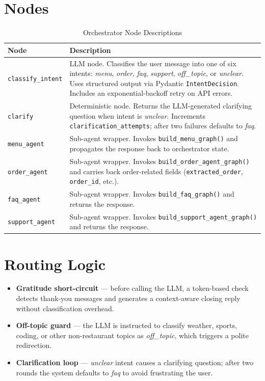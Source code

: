 \documentclass[12pt,a4paper]{report}
\begin{document}
\section{Nodes}

\begin{table}[H]
\centering
\caption{Orchestrator Node Descriptions}
\begin{tabularx}{\textwidth}{lX}
\toprule
\textbf{Node} & \textbf{Description} \\
\midrule
\texttt{classify\_intent}  &
    LLM node. Classifies the user message into one of six intents:
    \textit{menu}, \textit{order}, \textit{faq}, \textit{support}, \textit{off\_topic},
    or \textit{unclear}. Uses structured output via Pydantic \texttt{IntentDecision}.
    Includes an exponential-backoff retry on API errors. \\[0.4em]
\texttt{clarify}           &
    Deterministic node. Returns the LLM-generated clarifying question when intent is
    \textit{unclear}. Increments \texttt{clarification\_attempts}; after two failures
    defaults to \textit{faq}. \\[0.4em]
\texttt{menu\_agent}       &
    Sub-agent wrapper. Invokes \texttt{build\_menu\_graph()} and propagates the
    response back to orchestrator state. \\[0.4em]
\texttt{order\_agent}      &
    Sub-agent wrapper. Invokes \texttt{build\_order\_agent\_graph()} and carries
    back order-related fields (\texttt{extracted\_order}, \texttt{order\_id}, etc.). \\[0.4em]
\texttt{faq\_agent}        &
    Sub-agent wrapper. Invokes \texttt{build\_faq\_graph()} and returns the response. \\[0.4em]
\texttt{support\_agent}    &
    Sub-agent wrapper. Invokes \texttt{build\_support\_agent\_graph()} and returns
    the response. \\
\bottomrule
\end{tabularx}
\end{table}

\section{Routing Logic}

\begin{itemize}
    \item \textbf{Gratitude short-circuit} — before calling the LLM, a token-based
          check detects thank-you messages and generates a context-aware closing reply
          without classification overhead.
    \item \textbf{Off-topic guard} — the LLM is instructed to classify weather, sports,
          coding, or other non-restaurant topics as \textit{off\_topic}, which triggers
          a polite redirection.
    \item \textbf{Clarification loop} — \textit{unclear} intent causes a clarifying
          question; after two rounds the system defaults to \textit{faq} to avoid
          frustrating the user.
\end{itemize}
\end{document}
